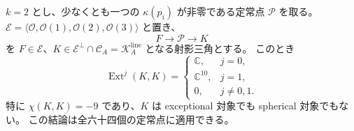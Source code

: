 \begin{proposition}
\label{cmo:prop:projected-point-ext}
$k=2$ とし、少なくとも一つの $\kappa(p_i)$ が非零である定常点
$\mathcal P$ を取る。
$\mathcal E=\langle\mathcal O,\mathcal O(1),\mathcal O(2),\mathcal O(3)\rangle$ と置き、
\[
 F\longrightarrow\mathcal P\longrightarrow K
\]
を $F\in\mathcal E$、$K\in\mathcal E^\perp\cap\mathcal C_A
=\mathcal K_A^{\mathrm{line}}$ となる射影三角とする。
このとき
\begin{equation}\label{cmo:eq:projected-point-ext}
 \operatorname{Ext}^j(K,K)=
 \begin{cases}
  \mathbb C,&j=0,\\
  \mathbb C^{10},&j=1,\\
  0,&j\ne0,1.
 \end{cases}
\end{equation}
特に $\chi(K,K)=-9$ であり、$K$ は exceptional 対象でも spherical 対象でもない。
この結論は全六十四個の定常点に適用できる。
\end{proposition}
